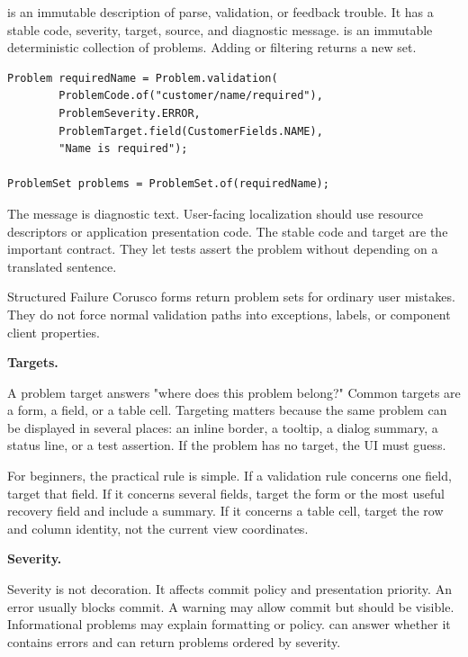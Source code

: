 is an immutable description of parse, validation,
or feedback trouble. It has a stable code, severity, target, source, and
diagnostic message.  is an immutable deterministic collection of
problems. Adding or filtering returns a new set.

\begin{lstlisting}[caption={A validation problem with stable identity.}]
Problem requiredName = Problem.validation(
        ProblemCode.of("customer/name/required"),
        ProblemSeverity.ERROR,
        ProblemTarget.field(CustomerFields.NAME),
        "Name is required");

ProblemSet problems = ProblemSet.of(requiredName);
\end{lstlisting}

The message is diagnostic text. User-facing localization should use resource
descriptors or application presentation code. The stable code and target are the
important contract. They let tests assert the problem without depending on a
translated sentence.

\begin{coruscobox}{Structured Failure}
Corusco forms return problem sets for ordinary user mistakes. They do not force
normal validation paths into exceptions, labels, or component client properties.
\end{coruscobox}

\textbf{Targets.}

A problem target answers "where does this problem belong?" Common targets are a
form, a field, or a table cell. Targeting matters because the same problem can
be displayed in several places: an inline border, a tooltip, a dialog summary,
a status line, or a test assertion. If the problem has no target, the UI must
guess.

For beginners, the practical rule is simple. If a validation rule concerns one
field, target that field. If it concerns several fields, target the form or the
most useful recovery field and include a summary. If it concerns a table cell,
target the row and column identity, not the current view coordinates.

\textbf{Severity.}

Severity is not decoration. It affects commit policy and presentation priority.
An error usually blocks commit. A warning may allow commit but should be visible.
Informational problems may explain formatting or policy.  can
answer whether it contains errors and can return problems ordered by severity.

